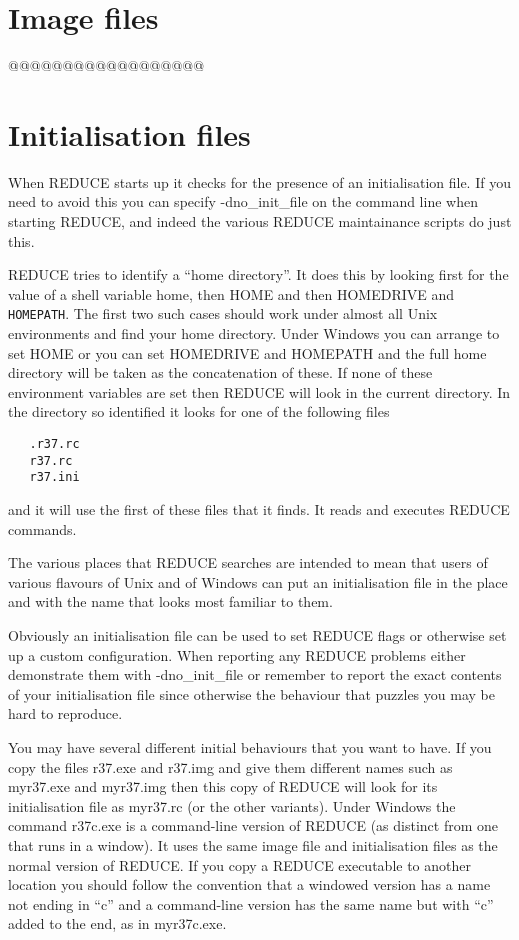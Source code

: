 \documentclass[a4paper,11pt]{article}
\begin{document}
\section{Image files}

@@@@@@@@@@@@@@@@@@


\section{Initialisation files}
When REDUCE starts up it checks for the presence of an initialisation
file. If you need to avoid this you can specify {\ttfamily -dno\_init\_file}
on the command line when starting REDUCE, and indeed the various REDUCE
maintainance scripts do just this.

REDUCE tries to identify a ``home directory''. It does this by looking first
for the value of a shell variable {\ttfamily home}, then {\ttfamily HOME}
and then {\ttfamily HOMEDRIVE} and {\tt HOMEPATH}. The first two such
cases should work under almost all Unix environments and find your home
directory. Under Windows you can arrange to set {\ttfamily HOME} or
you can set {\ttfamily HOMEDRIVE} and {\ttfamily HOMEPATH} and the full
home directory will be taken as the concatenation of these.  If none of these
environment variables are set then REDUCE will look in the current directory.
In the directory so identified it looks for one of the following files
\begin{verbatim}
   .r37.rc
   r37.rc
   r37.ini
\end{verbatim}
\noindent and it will use the first of these files that it finds. It reads
and executes REDUCE commands.

The various places that REDUCE searches are intended to mean that users
of various flavours of Unix and of Windows can put an initialisation
file in the place and with the name that looks most familiar to them.

Obviously an initialisation file can be used to set REDUCE flags or
otherwise set up a custom configuration. When reporting any REDUCE
problems either demonstrate them with {\ttfamily -dno\_init\_file} or
remember to report the exact contents of your initialisation file since
otherwise the behaviour that puzzles you may be hard to reproduce.


You may have several different initial behaviours that you want to have.
If you copy the files {\ttfamily r37.exe} and {\ttfamily r37.img} and give
them different names such as {\ttfamily myr37.exe} and {\ttfamily myr37.img}
then this copy of REDUCE will look for its initialisation file as
{\ttfamily myr37.rc} (or the other variants).  Under Windows the command
{\ttfamily r37c.exe} is a command-line version of REDUCE (as distinct
from one that runs in a window). It uses the same image file and
initialisation files as the normal version of REDUCE. If you copy a
REDUCE executable to another location you should follow the convention
that a windowed version has a name not ending in ``c'' and a command-line
version has the same name but with ``c'' added to the end, as in {\ttfamily
myr37c.exe}.
\end{document}
